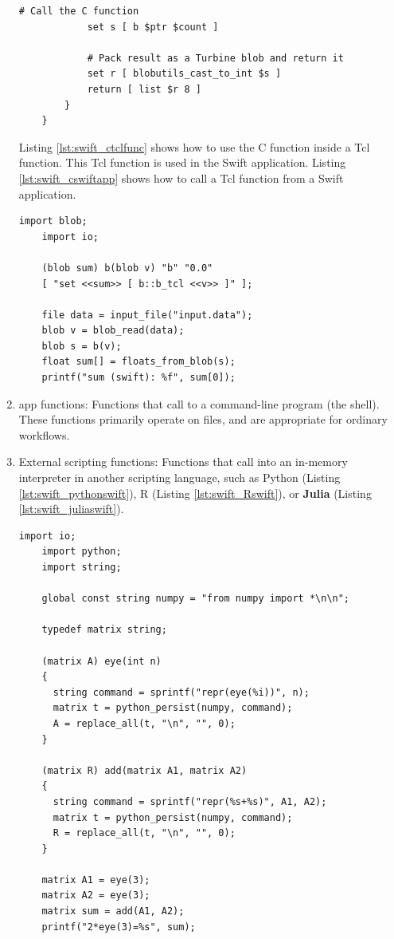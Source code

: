 \begin{enumerate}
\begin{lstlisting}[basicstyle=\ttfamily, tabsize=3, frame=single, caption=Tcl wrapper around the C funtion\label{lst:swift_ctclfunc}]
	        # Call the C function
	        set s [ b $ptr $count ]

	        # Pack result as a Turbine blob and return it
	        set r [ blobutils_cast_to_int $s ]
	        return [ list $r 8 ]
	    }
	}
	\end{lstlisting}
	Listing \ref{lst:swift_ctclfunc} shows how to use the C function inside a Tcl function.
	This Tcl function is used in the Swift application.
	Listing \ref{lst:swift_cswiftapp} shows how to call a Tcl function from a Swift application.

	\begin{lstlisting}[basicstyle=\ttfamily, tabsize=3, frame=single, caption=Call of the Tcl wrapper by a Swift application\label{lst:swift_cswiftapp}]
	import blob;
	import io;

	(blob sum) b(blob v) "b" "0.0"
	[ "set <<sum>> [ b::b_tcl <<v>> ]" ];

	file data = input_file("input.data");
	blob v = blob_read(data);
	blob s = b(v);
	float sum[] = floats_from_blob(s);
	printf("sum (swift): %f", sum[0]);
	\end{lstlisting}
	\item app functions: Functions that call to a command-line program (the shell).
	These functions primarily operate on files, and are appropriate for ordinary workflows.
	\item External scripting functions: Functions that call into an in-memory interpreter in another scripting language, such as Python (Listing \ref{lst:swift_pythonswift}), R (Listing \ref{lst:swift_Rswift}), or \textbf{Julia} (Listing \ref{lst:swift_juliaswift}).
	\begin{lstlisting}[basicstyle=\ttfamily, tabsize=3, frame=single, caption=Call of python code by a Swift application\label{lst:swift_pythonswift}]
	import io;
	import python;
	import string;

	global const string numpy = "from numpy import *\n\n";

	typedef matrix string;

	(matrix A) eye(int n)
	{
	  string command = sprintf("repr(eye(%i))", n);
	  matrix t = python_persist(numpy, command);
	  A = replace_all(t, "\n", "", 0);
	}

	(matrix R) add(matrix A1, matrix A2)
	{
	  string command = sprintf("repr(%s+%s)", A1, A2);
	  matrix t = python_persist(numpy, command);
	  R = replace_all(t, "\n", "", 0);
	}

	matrix A1 = eye(3);
	matrix A2 = eye(3);
	matrix sum = add(A1, A2);
	printf("2*eye(3)=%s", sum);
	\end{lstlisting}



\end{enumerate}
